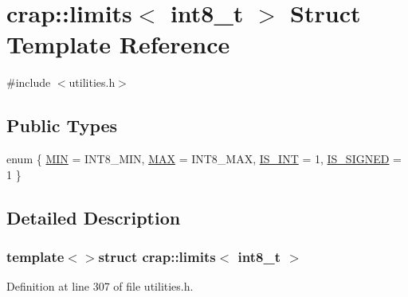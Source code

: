 \hypertarget{structcrap_1_1limits_3_01int8__t_01_4}{\section{crap\+:\+:limits$<$ int8\+\_\+t $>$ Struct Template Reference}
\label{structcrap_1_1limits_3_01int8__t_01_4}
}


{\ttfamily \#include $<$utilities.\+h$>$}

\subsection*{Public Types}
\begin{DoxyCompactItemize}
\item 
enum \{ \hyperlink{structcrap_1_1limits_3_01int8__t_01_4_a05d8ad2658a42c30bf779f24ca89536ba6823d6bcb5d7b70e7f8322dd0c7fd7df}{M\+I\+N} = I\+N\+T8\+\_\+\+M\+I\+N, 
\hyperlink{structcrap_1_1limits_3_01int8__t_01_4_a05d8ad2658a42c30bf779f24ca89536ba9543c5a48d5992dc82e76d69429da979}{M\+A\+X} = I\+N\+T8\+\_\+\+M\+A\+X, 
\hyperlink{structcrap_1_1limits_3_01int8__t_01_4_a05d8ad2658a42c30bf779f24ca89536bacbd9edde5039c13a6d9b426a2a5572ce}{I\+S\+\_\+\+I\+N\+T} = 1, 
\hyperlink{structcrap_1_1limits_3_01int8__t_01_4_a05d8ad2658a42c30bf779f24ca89536ba258700f71fd08d84a95da134315f85c4}{I\+S\+\_\+\+S\+I\+G\+N\+E\+D} = 1
 \}
\end{DoxyCompactItemize}


\subsection{Detailed Description}
\subsubsection*{template$<$$>$struct crap\+::limits$<$ int8\+\_\+t $>$}



Definition at line 307 of file utilities.\+h.



